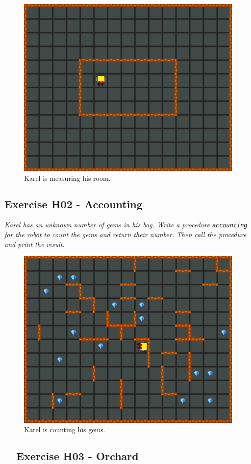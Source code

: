 \documentclass[article,A4,12pt]{llncs}
\begin{document}
{{{{\newpage
\begin{figure}[!ht]
\begin{center}
\includegraphics[height=0.4\textwidth]{img/h01.png}
\end{center}
\vspace{-4mm}
\caption{Karel is measuring his room.}
\label{fig:h01}
\vspace{-4mm}
\end{figure}
\noindent

\subsection{Exercise H02 - Accounting}

{\em Karel has an unknown number of gems in his bag. Write a procedure {\tt accounting} for the 
robot to count the gems and return their number. Then call the procedure and print the result.}

\begin{figure}[!ht]
\begin{center}
\includegraphics[height=0.4\textwidth]{img/h02.png}
\end{center}
\vspace{-4mm}
\caption{Karel is counting his gems.}
\label{fig:h02}
\vspace{-4mm}
\end{figure}
\noindent

\subsection{\ \ Exercise H03 - Orchard}

}}}}
\end{document}
